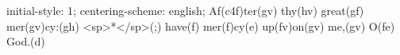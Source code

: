 initial-style: 1;
centering-scheme: english;
Af(c4f)ter(gv) thy(hv) great(gf) mer(gv)cy:(gh) <sp>*</sp>(;) have(f) mer(f)cy(e) up(fv)on(gv) me,(gv) O(fe) God.(d)
